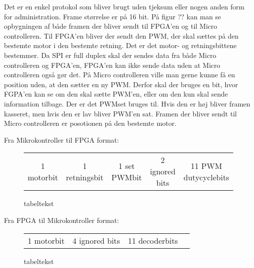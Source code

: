 Det er en enkel protokol som bliver brugt uden tjeksum eller nogen anden form for administration. Frame størrelse er på 16 bit. På figur ?? kan man se opbygningen af både framen der bliver sendt til FPGA’en og til Micro controlleren. Til FPGA’en bliver der sendt den PWM, der skal sættes på den bestemte motor i den bestemte retning. Det er det motor- og retningsbittene bestemmer. Da SPI er full duplex skal der sendes data fra både Micro controlleren og FPGA’en, FPGA’en kan ikke sende data uden at Micro controlleren også gør det. På Micro controlleren ville man gerne kunne få en position uden, at den sætter en ny PWM. Derfor skal der bruges en bit, hvor FGPA’en kan se om den skal sætte PWM’en, eller om den kun skal sende information tilbage. Der er det PWMset bruges til. Hvis den er høj bliver framen kasseret, men hvis den er lav bliver PWM’en sat. Framen der bliver sendt til Micro controlleren er posotionen på den bestemte motor.  


  
Fra Mikrokontroller til FPGA format:
\begin{figure}[th!]
\centering
\begin{tabular}{c|c|c|c|c}
1 motorbit &1 retningsbit & 1 set PWMbit & 2 ignored bits & 11 PWM dutycyclebits
\end{tabular}
\captionsetup{type=figure}
\caption[tekst i indholdsfortegnelsen]{tabeltekst}
\label{tb:protokol1}
\end{figure}

   
  
  Fra FPGA til Mikrokontroller format:
 \begin{figure}[th!]
 \centering
 \begin{tabular}{c|c|c|c}
 1 motorbit & 4 ignored bits & 11 decoderbits
  
 \end{tabular}
 \captionsetup{type=figure}
 \caption[tekst i indholdsfortegnelsen]{tabeltekst}
 \label{tb:protokol2}
 \end{figure}

